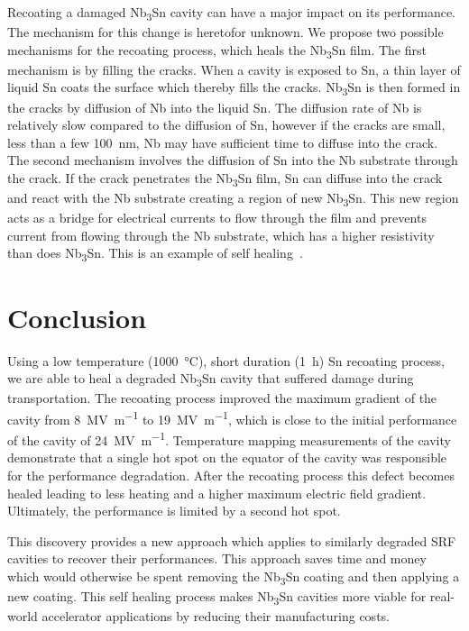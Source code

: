 Recoating a damaged Nb\textsubscript{3}Sn cavity can have a major impact on its performance. The mechanism for this change is heretofor unknown. We propose two possible mechanisms for the recoating process, which heals the Nb\textsubscript{3}Sn film. The first mechanism is by filling the cracks. When a cavity is exposed to Sn, a thin layer of liquid Sn coats the surface which thereby fills the cracks. Nb\textsubscript{3}Sn is then formed in the cracks by diffusion of Nb into the liquid Sn. The diffusion rate of Nb is relatively slow compared to the diffusion of Sn, however if the cracks are small, less than a few \qty{100}{nm}, Nb may have sufficient time to diffuse into the crack. The second mechanism involves the diffusion of Sn into the Nb substrate through the crack. If the crack penetrates the Nb\textsubscript{3}Sn film, Sn can diffuse into the crack and react with the Nb substrate creating a region of new Nb\textsubscript{3}Sn. This new region acts as a bridge for electrical currents to flow through the film and prevents current from flowing through the Nb substrate, which has a higher resistivity than does Nb\textsubscript{3}Sn. This is an example of self healing~\cite{Sloof2007}.


\section{Conclusion}
\label{sec:Conclusion}

Using a low temperature (\qty{1000}{\degreeCelsius}), short duration (\qty{1}{\hour}) Sn recoating process, we are able to heal a degraded Nb\textsubscript{3}Sn cavity that suffered damage during transportation. The recoating process improved the maximum gradient of the cavity from \qty{8}{\mega\volt\per\meter} to \qty{19}{\mega\volt\per\meter}, which is close to the initial performance of the cavity of \qty{24}{\mega\volt\per\meter}. Temperature mapping measurements of the cavity demonstrate that a single hot spot on the equator of the cavity was responsible for the performance degradation. After the recoating process this defect becomes healed leading to less heating and a higher maximum electric field gradient. Ultimately, the performance is limited by a second hot spot.

This discovery provides a new approach which applies to similarly degraded SRF cavities to recover their performances. This approach saves time and money which would otherwise be spent removing the Nb\textsubscript{3}Sn coating and then applying a new coating. This self healing process makes Nb\textsubscript{3}Sn cavities more viable for real-world accelerator applications by reducing their manufacturing costs.
